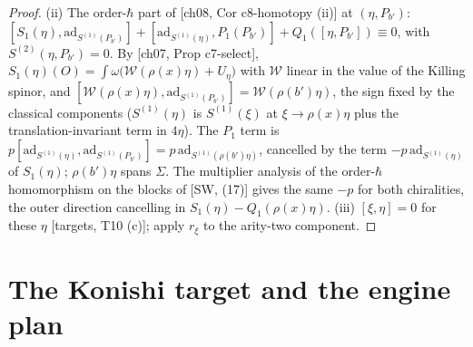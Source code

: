 \begin{proof}
(ii) The order-$\hbar$ part of [ch08, Cor c8-homotopy (ii)] at $(\eta,P_{b'})$: $[S_1(\eta),\mathrm{ad}_{S^{(1)}(P_{b'})}]+[\mathrm{ad}_{S^{(1)}(\eta)},P_1(P_{b'})]+Q_1([\eta,P_{b'}])\equiv0$, with $S^{(2)}(\eta,P_{b'})=0$. By [ch07, Prop c7-select], $S_1(\eta)(O)=\int\omega\big(\mathcal W(\rho(x)\eta)+U_\eta\big)$ with $\mathcal W$ linear in the value of the Killing spinor, and $[\mathcal W(\rho(x)\eta),\mathrm{ad}_{S^{(1)}(P_{b'})}]=\mathcal W(\rho(b')\eta)$, the sign fixed by the classical components ($S^{(1)}(\eta)$ is $S^{(1)}(\xi)$ at $\xi\to\rho(x)\eta$ plus the translation-invariant term in $4\eta$). The $P_1$ term is $p[\mathrm{ad}_{S^{(1)}(\eta)},\mathrm{ad}_{S^{(1)}(P_{b'})}]=p\,\mathrm{ad}_{S^{(1)}(\rho(b')\eta)}$, cancelled by the term $-p\,\mathrm{ad}_{S^{(1)}(\eta)}$ of $S_1(\eta)$; $\rho(b')\eta$ spans $\Sigma$. The multiplier analysis of the order-$\hbar$ homomorphism on the blocks of [SW, (17)] gives the same $-p$ for both chiralities, the outer direction cancelling in $S_1(\eta)-Q_1(\rho(x)\eta)$. (iii) $[\xi,\eta]=0$ for these $\eta$ [targets, T10 (c)]; apply $r_\xi$ to the arity-two component.
\end{proof}

\section{The Konishi target and the engine plan}


